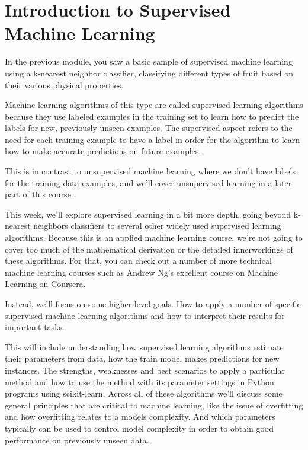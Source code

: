 \section{Introduction to Supervised Machine Learning}
\begin{multicols}{2}

In the previous module, you saw a basic sample of supervised machine learning using a k-nearest neighbor classifier, classifying different types of fruit based on their various physical properties. 

Machine learning algorithms of this type are called supervised learning algorithms because they use labeled examples in the training set to learn how to predict the labels for new, previously unseen examples. The supervised aspect refers to the need for each training example to have a label in order for the algorithm to learn how to make accurate predictions on future examples. 

This is in contrast to unsupervised machine learning where we don't have labels for the training data examples, and we'll cover unsupervised learning in a later part of this course. 

This week, we'll explore supervised learning in a bit more depth, going beyond k-nearest neighbors classifiers to several other widely used supervised learning algorithms. Because this is an applied machine learning course, we're not going to cover too much of the mathematical derivation or the detailed innerworkings of these algorithms. For that, you can check out a number of more technical machine learning courses such as Andrew Ng's excellent course on Machine Learning on Coursera. 

Instead, we'll focus on some higher-level goals. How to apply a number of specific supervised machine learning algorithms and how to interpret their results for important tasks. 

This will include understanding how supervised learning algorithms estimate their parameters from data, how the train model makes predictions for new instances. The strengths, weaknesses and best scenarios to apply a particular method and how to use the method with its parameter settings in Python programs using scikit-learn. Across all of these algorithms we'll discuss some general principles that are critical to machine learning, like the issue of overfitting and how overfitting relates to a models complexity. And which parameters typically can be used to control model complexity in order to obtain good performance on previously unseen data. 


\end{multicols}
